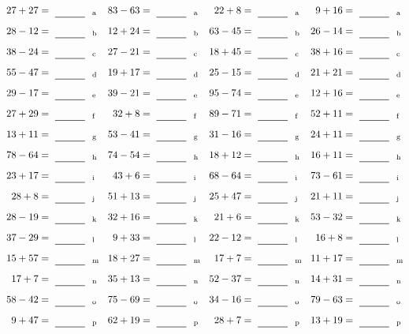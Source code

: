 \documentclass
[
  draft    = true,
  fontsize = 11pt,
  parskip  = half-
]
{scrartcl}
\begin{document}
\clearpage
\begin{align*}
    \pline{27+27}&=\rline{a}
  & \pline{83-63}&=\rline{a}
  & \pline{22+8}&=\rline{a}
  & \pline{9+16}&=\rline{a} \\[1ex]
    \pline{28-12}&=\rline{b}
  & \pline{12+24}&=\rline{b}
  & \pline{63-45}&=\rline{b}
  & \pline{26-14}&=\rline{b} \\[1ex]
    \pline{38-24}&=\rline{c}
  & \pline{27-21}&=\rline{c}
  & \pline{18+45}&=\rline{c}
  & \pline{38+16}&=\rline{c} \\[1ex]
    \pline{55-47}&=\rline{d}
  & \pline{19+17}&=\rline{d}
  & \pline{25-15}&=\rline{d}
  & \pline{21+21}&=\rline{d} \\[1ex]
    \pline{29-17}&=\rline{e}
  & \pline{39-21}&=\rline{e}
  & \pline{95-74}&=\rline{e}
  & \pline{12+16}&=\rline{e} \\[1ex]
    \pline{27+29}&=\rline{f}
  & \pline{32+8}&=\rline{f}
  & \pline{89-71}&=\rline{f}
  & \pline{52+11}&=\rline{f} \\[1ex]
    \pline{13+11}&=\rline{g}
  & \pline{53-41}&=\rline{g}
  & \pline{31-16}&=\rline{g}
  & \pline{24+11}&=\rline{g} \\[1ex]
    \pline{78-64}&=\rline{h}
  & \pline{74-54}&=\rline{h}
  & \pline{18+12}&=\rline{h}
  & \pline{16+11}&=\rline{h} \\[1ex]
    \pline{23+17}&=\rline{i}
  & \pline{43+6}&=\rline{i}
  & \pline{68-64}&=\rline{i}
  & \pline{73-61}&=\rline{i} \\[1ex]
    \pline{28+8}&=\rline{j}
  & \pline{51+13}&=\rline{j}
  & \pline{25+47}&=\rline{j}
  & \pline{21+11}&=\rline{j} \\[1ex]
    \pline{28-19}&=\rline{k}
  & \pline{32+16}&=\rline{k}
  & \pline{21+6}&=\rline{k}
  & \pline{53-32}&=\rline{k} \\[1ex]
    \pline{37-29}&=\rline{l}
  & \pline{9+33}&=\rline{l}
  & \pline{22-12}&=\rline{l}
  & \pline{16+8}&=\rline{l} \\[1ex]
    \pline{15+57}&=\rline{m}
  & \pline{18+27}&=\rline{m}
  & \pline{17+7}&=\rline{m}
  & \pline{11+17}&=\rline{m} \\[1ex]
    \pline{17+7}&=\rline{n}
  & \pline{35+13}&=\rline{n}
  & \pline{52-37}&=\rline{n}
  & \pline{14+31}&=\rline{n} \\[1ex]
    \pline{58-42}&=\rline{o}
  & \pline{75-69}&=\rline{o}
  & \pline{34-16}&=\rline{o}
  & \pline{79-63}&=\rline{o} \\[1ex]
    \pline{9+47}&=\rline{p}
  & \pline{62+19}&=\rline{p}
  & \pline{28+7}&=\rline{p}
  & \pline{13+19}&=\rline{p}
\end{align*}
\end{document}
